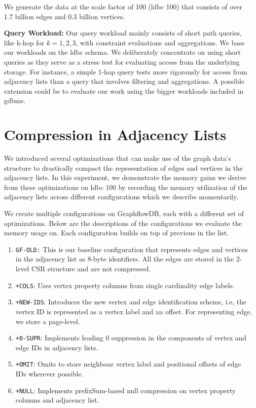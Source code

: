 We generate the data at the scale factor of 100 (\gls{ldbc} 100) that consists of over 1.7 billion edges and 0.3 billion vertices.

\noindent \textbf{Query Workload:} Our query workload mainly consists of short path queries, like k-hop for $k=1,2,3$, with constraint evaluations and aggregations. We base our workloads on the \gls{ldbc} schema. We deliberately concentrate on using short queries as they serve as a stress test for evaluating access from the underlying storage. For instance, a simple 1-hop query tests more rigorously for access from adjacency lists than a query that involves filtering and aggregations. A possible extension could be to evaluate our work using the bigger workloads included in \gls{gdbms}.

\section{Compression in Adjacency Lists}
\label{exp:adjacency-list-exp}

We introduced several optimizations that can make use of the graph data's structure to drastically compact the representation of edges and vertices in the adjacency lists. In this experiment, we demonstrate the memory gains we derive from these optimizations on \gls{ldbc} 100 by recording the memory utilization of the adjacency lists across different configurations which we describe momentarily.

We create multiple configurations on GraphflowDB, each with a different set of optimizations. Below are the descriptions of the configurations we evaluate the memory usage on. Each configuration builds on top of previous in the list. 

\begin{enumerate}
	\item \texttt{GF-OLD:} This is our baseline configuration that represents edges and vertices in the adjacency list as 8-byte identifiers. All the edges are stored in the 2-level CSR structure and are not compressed.
	\item \texttt{+COLS}: Uses vertex property columns from single cardinality edge labels. 
	\item \texttt{+NEW-IDS}: Introduces the new vertex and edge identification scheme, i.e, the vertex ID is represented as a vertex label and an offset. For representing edge, we store a page-level.
	\item \texttt{+0-SUPR}: Implements leading 0 suppression in the components of vertex and edge IDs in adjacency lists.
	\item \texttt{+OMIT}: Omits to store neighbour vertex label and positional offsets of edge IDs wherever possible.
	\item \texttt{+NULL}: Implements prefixSum-based null compression on vertex property columns and adjacency list.
\end{enumerate}

